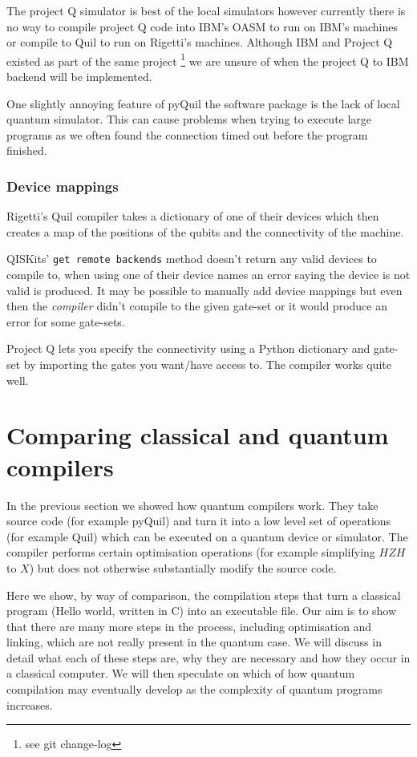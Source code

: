 The project Q simulator is best of the local simulators however currently there is no way to compile project Q code into IBM's OASM to run on IBM's machines or compile to Quil to run on Rigetti's machines. Although IBM and Project Q existed as part of the same project \footnote{see git change-log} we are unsure of when the project Q to IBM backend will be implemented. 

One slightly annoying feature of pyQuil the software package is the lack of local quantum simulator. This can cause problems when trying to execute large programs as we often found the connection timed out before the program finished. 

\subsubsection{Device mappings}

Rigetti's Quil compiler takes a dictionary of one of their devices which then creates a map of the positions of the qubits and the connectivity of the machine. 

QISKits' \texttt{get remote backends} method doesn't return any valid devices to compile to, when using one of their device names an error saying the device is not valid is produced. It may be possible to manually add device mappings but even then the \textit{compiler} didn't compile to the given gate-set or it would produce an error for some gate-sets.

Project Q lets you specify the connectivity using a Python dictionary and gate-set by importing the gates you want/have access to. The compiler works quite well.

\section{Comparing classical and quantum compilers}

In the previous section we showed how quantum compilers work. They take source code (for example pyQuil) and turn it into a low level set of operations (for example Quil) which can be executed on a quantum device or simulator. The compiler performs certain optimisation operations (for example simplifying $HZH$ to $X$) but does not otherwise substantially modify the source code. 

Here we show, by way of comparison, the compilation steps that turn a classical program (Hello world, written in C) into an executable file. Our aim is to show that there are many more steps in the process, including optimisation and linking, which are not really present in the quantum case. We will discuss in detail what each of these steps are, why they are necessary and how they occur in a classical computer. We will then speculate on which of how quantum compilation may eventually develop as the complexity of quantum programs increases.

